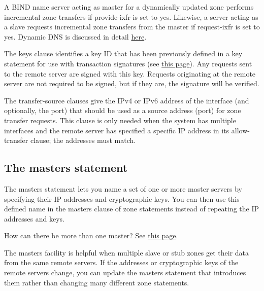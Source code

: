 A BIND name server acting as master for a dynamically updated zone
performs incremental zone transfers if {provide-ixfr} is set to {yes}.
Likewise, a server acting as a slave requests incremental zone transfers
from the master if {request-ixfr} is set to {yes}. Dynamic DNS is
discussed in detail
\protect\hyperlink{part0024_split_052.htmlux5cux23_idTextAnchor928}{here}.

The {keys} clause identifies a key ID that has been previously defined
in a {key} statement for use with transaction signatures (see
\protect\hyperlink{part0024_split_057.htmlux5cux23_idTextAnchor936}{this
page}). Any requests sent to the remote server are signed with this key.
Requests originating at the remote server are not required to be signed,
but if they are, the signature will be verified.

The {transfer-source} clauses give the IPv4 or IPv6 address of the
interface (and optionally, the port) that should be used as a source
address (port) for zone transfer requests. This clause is only needed
when the system has multiple interfaces and the remote server has
specified a specific IP address in its {allow-transfer} clause; the
addresses must match.

\protect\hypertarget{part0024_split_041.html}{}{}

\hypertarget{part0024_split_041.htmlux5cux23_idContainer1069}{}
\hypertarget{part0024_split_041.htmlux5cux23calibre_pb_40}{%
\subsection[The {masters}
statement]{\texorpdfstring{\protect\hypertarget{part0024_split_041.htmlux5cux23_idTextAnchor908}{}{}The
{masters}
statement}{The masters statement}}\label{part0024_split_041.htmlux5cux23calibre_pb_40}}

\protect\hypertarget{part0024_split_041.htmlux5cux23_idIndexMarker2181}{}{}The
{masters} statement lets you name a set of one or more master servers by
specifying their IP addresses and cryptographic keys. You can then use
this defined name in the {masters} clause of {zone} statements instead
of repeating the IP addresses and keys.

\leavevmode\hypertarget{part0024_split_041.htmlux5cux23_idContainer989}{}%
How can there be more than one master? See
\protect\hyperlink{part0024_split_044.htmlux5cux23_idTextAnchor915}{this
page}.

The {masters} facility is helpful when multiple slave or stub zones get
their data from the same remote servers. If the addresses or
cryptographic keys of the remote servers change, you can update the
{masters} statement that introduces them rather than changing many
different {zone} statements.

